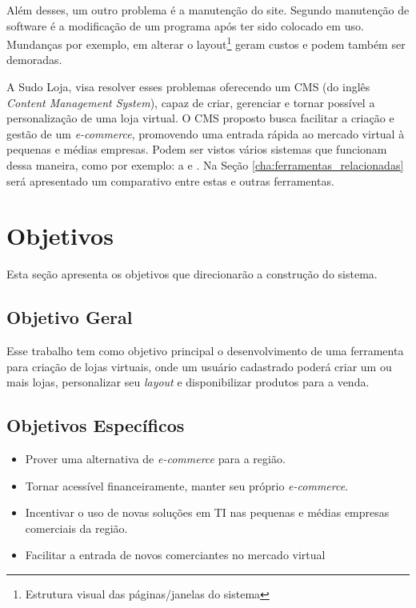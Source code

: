 \documentclass[a4paper,12pt]{monografia}
\begin{document}
Além desses, um outro problema é a manutenção do site. Segundo  manutenção de software é a modificação de um programa após ter sido colocado em uso. Mundanças por exemplo, em alterar o layout\footnote{Estrutura visual das páginas/janelas do sistema} geram custos e podem também ser demoradas.

A Sudo Loja, visa resolver esses problemas oferecendo um CMS (do inglês \textit{Content Management System}), capaz de criar, gerenciar e tornar possível a personalização de uma loja virtual. O CMS proposto busca facilitar a criação e gestão de um \textit{e-commerce}, promovendo uma entrada rápida ao mercado virtual à pequenas e médias empresas. Podem ser vistos vários sistemas que funcionam dessa maneira, como por exemplo: a  e . Na Seção \ref{cha:ferramentas_relacionadas} será apresentado um comparativo entre estas e outras ferramentas.



\section{Objetivos} %
\label{sec:objetivos}

Esta seção apresenta os objetivos que direcionarão a construção do sistema.

\subsection{Objetivo Geral} %
\label{sub:objetivo_geral}

Esse trabalho tem como objetivo principal o desenvolvimento de uma ferramenta para criação de lojas virtuais, onde um usuário cadastrado poderá criar um ou mais lojas, personalizar seu \textit{layout} e disponibilizar produtos para a venda.


\subsection{Objetivos Específicos} %
\label{sub:objetivos_espec}

\begin{itemize}
\item Prover uma alternativa de \textit{e-commerce} para a região.
\item Tornar acessível financeiramente, manter seu próprio \textit{e-commerce}.
\item Incentivar o uso de novas soluções em TI nas pequenas e médias empresas comerciais da região.
\item Facilitar a entrada de novos comerciantes no mercado virtual
\end{itemize}
\end{document}
